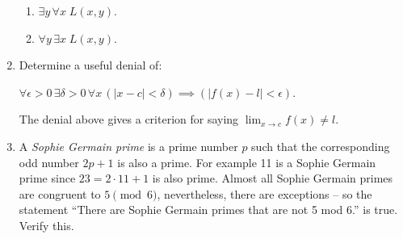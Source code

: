 \begin{enumerate}
{\begin{enumerate}
\vspace{.5in}

Here's a couple of bonus questions.  Two of the statements above have different meanings if you just interchange the order that the quantifiers appear in.  What do the following mean (in contrast to the ones above)?

\item $\exists y \, \forall x \; L(x, y)$.
\item $\forall y \, \exists x \; L(x,y)$.
\end{enumerate}

}

\wbvfill

\workbookpagebreak

\item Determine a useful denial of: 

$\displaystyle \forall \epsilon>0 \, \exists 
\delta>0 \, \forall x \, (|x-c| < \delta) \implies (|f(x)-l| < \epsilon) $.

The denial above gives a criterion for saying $\lim_{x\rightarrow c}f(x) \neq l.$


\wbvfill

\item A  \emph{Sophie Germain prime} is a prime number $p$
such that the corresponding odd number $2p+1$ is also a prime.  For example 11 is a 
Sophie Germain prime since $23 = 2\cdot 11 + 1$ is also prime.  Almost all Sophie Germain
primes are congruent to $5 \pmod{6}$, nevertheless, there are exceptions -- so the
statement ``There are Sophie Germain primes that are not 5 mod 6.'' is true.  Verify this.



\end{enumerate}
